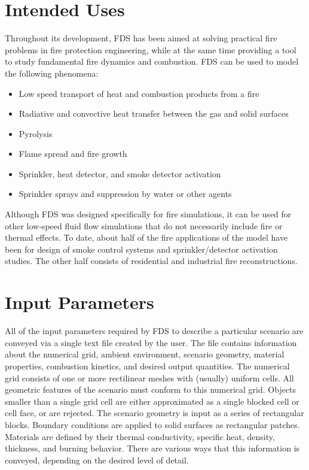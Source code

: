 \documentclass[11pt]{book}
\begin{document}
\section{Intended Uses}

Throughout its development, FDS has been aimed at solving practical fire problems in fire protection engineering, while at the same time providing a
tool to study fundamental fire dynamics and combustion. FDS can be used to model the following phenomena:
\begin{itemize}
\setlength{\itemsep}{0.0in}
\item Low speed transport of heat and combustion products from a fire
\item Radiative and convective heat transfer between the gas and solid surfaces
\item Pyrolysis
\item Flame spread and fire growth
\item Sprinkler, heat detector, and smoke detector activation
\item Sprinkler sprays and suppression by water or other agents
\end{itemize}
Although FDS was designed specifically for fire simulations, it can be used for other low-speed fluid flow simulations that do not necessarily include fire or thermal effects. To date, about half of the fire applications of the model have been for design of smoke control systems and sprinkler/detector activation studies. The other half consists of residential and industrial fire reconstructions. 


\section{Input Parameters}

All of the input parameters required by FDS to describe a particular scenario are conveyed via a single text file created by the user. The file contains information about the numerical grid, ambient environment, scenario geometry, material properties, combustion kinetics, and desired output quantities. The numerical grid consists of one or more rectilinear meshes with (usually) uniform cells. All geometric features of the scenario must conform to this numerical grid. Objects smaller than a single grid cell are either approximated as a single blocked cell or cell face, or are rejected. The scenario geometry is input as a series of rectangular blocks. Boundary conditions are applied to solid surfaces as rectangular patches. Materials are defined by their thermal conductivity, specific heat, density, thickness, and burning behavior. There are various ways that this information is conveyed, depending on the desired level of detail.
\end{document}
